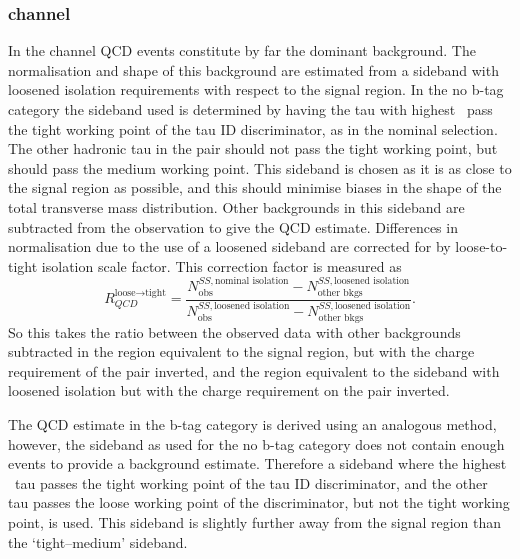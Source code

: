 \subsubsection{\texorpdfstring{\tautau channel}{tau tau channel}}
\label{sec:mssm_bkgs_qcd_tt}
In the \tautau channel QCD events constitute by far the dominant background.
The normalisation and shape 
of this background are estimated from a sideband with loosened 
isolation requirements with respect to the signal region. 
In the no b-tag category the sideband used is determined
by having the tau with highest \pT~pass the tight working
point of the tau ID discriminator, as in the nominal selection.
The other hadronic tau in the pair should not pass the tight working point,
but should pass the medium working point. This sideband is 
chosen as it is as close to the signal region as possible, and 
this should minimise biases in the shape of the total transverse mass
distribution. Other backgrounds
in this sideband are subtracted from the observation to give
the QCD estimate. Differences in normalisation due to
the use of a loosened sideband are corrected for by loose-to-tight isolation
scale factor. This correction factor is measured as
\begin{equation}\label{eqn:tautau_qcd}
R_{QCD}^{\text{loose}\rightarrow\text{tight}} = \frac{N_{\text{obs}}^{SS,\text{nominal isolation}}-N_{\text{other bkgs}}^{SS,\text{loosened isolation}}}{N_{\text{obs}}^{SS,\text{loosened isolation}}-N_{\text{other bkgs}}^{SS,\text{loosened isolation}}}.
\end{equation}
So this takes the ratio between the observed data with other
backgrounds subtracted in the region equivalent to the signal region, but with the
charge requirement of the pair inverted, and the region equivalent to the sideband
with loosened isolation but with the charge requirement on the pair inverted.

The QCD estimate in the b-tag category is derived using an analogous method, 
 however, the sideband as used for the 
no b-tag category does not contain enough events to 
provide a background estimate. Therefore a sideband where
the highest \pT~tau passes the tight working point of the
tau ID discriminator, and the other tau passes the loose working
point of the discriminator, but not the tight working point, is used.
This sideband is slightly further away from the signal region than the
`tight--medium' sideband. %

